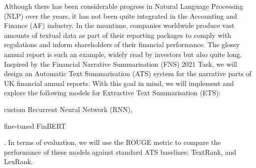 Although there has been considerable progress in Natural Language Processing (NLP) over the years, it has not been quite integrated in the Accounting and Finance (AF) industry. In the meantime, companies worldwide produce vast amounts of textual data as part of their reporting packages to comply with regulations and inform shareholders of their financial performance. The glossy annual report is such an example, widely read by investors but also quite long. Inspired by the Financial Narrative Summarisation (FNS) 2021 Task, we will design an Automatic Text Summarisation (ATS) system for the narrative parts of UK financial annual reports. With this goal in mind, we will implement and explore the following models for Extractive Text Summarisation (ETS): \begin{enumerate*} \item custom Recurrent Neural Network (RNN), \item fine-tuned FinBERT \end{enumerate*}. In terms of evaluation, we will use the ROUGE metric to compare the performance of these models against standard ATS baselines: TextRank, and LexRank.